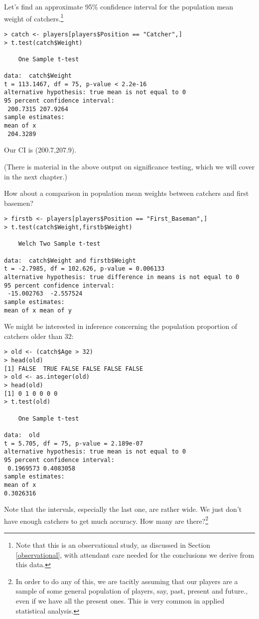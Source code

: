 Let's find an approximate 95\% confidence interval for the population
mean weight of catchers.\footnote{Note that this is an observational
study, as discussed in Section \ref{observational}, with attendant care
needed for the conclusions we derive from this data.}

\begin{lstlisting}
> catch <- players[players$Position == "Catcher",]
> t.test(catch$Weight)

	One Sample t-test

data:  catch$Weight
t = 113.1467, df = 75, p-value < 2.2e-16
alternative hypothesis: true mean is not equal to 0
95 percent confidence interval:
 200.7315 207.9264
sample estimates:
mean of x 
 204.3289 
\end{lstlisting}

Our CI is (200.7,207.9).

(There is material in the above output on significance testing, which we
will cover in the next chapter.)

How about a comparison in population mean weights between catchers and
first basemen?

\begin{lstlisting}
> firstb <- players[players$Position == "First_Baseman",]
> t.test(catch$Weight,firstb$Weight)

	Welch Two Sample t-test

data:  catch$Weight and firstb$Weight
t = -2.7985, df = 102.626, p-value = 0.006133
alternative hypothesis: true difference in means is not equal to 0
95 percent confidence interval:
 -15.002763  -2.557524
sample estimates:
mean of x mean of y 
\end{lstlisting}

We might be interested in inference concerning the population
proportion of catchers older than 32:

\begin{lstlisting}
> old <- (catch$Age > 32)
> head(old)
[1] FALSE  TRUE FALSE FALSE FALSE FALSE
> old <- as.integer(old)
> head(old)
[1] 0 1 0 0 0 0
> t.test(old)

	One Sample t-test

data:  old
t = 5.705, df = 75, p-value = 2.189e-07
alternative hypothesis: true mean is not equal to 0
95 percent confidence interval:
 0.1969573 0.4083058
sample estimates:
mean of x 
0.3026316 
\end{lstlisting}

Note that the intervals, especially the last one, are rather wide.  We
just don't have enough catchers to get much accuracy.  How many are
there?\footnote{In order to do any of this, we are tacitly assuming that
our players are a sample of some general population of players, say,
past, present and future., even if we have all the present ones.  This
is very common in applied statistical analysis.}

